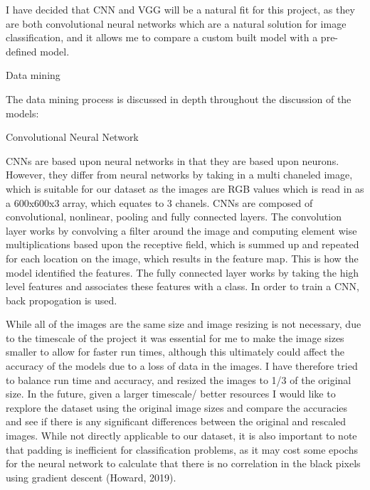 \documentclass[11pt]{article}
\begin{document}
I have decided that CNN and VGG will be a natural fit for this project,
as they are both convolutional neural networks which are a natural
solution for image classification, and it allows me to compare a custom
built model with a pre-defined model.

Data mining

The data mining process is discussed in depth throughout the discussion
of the models:

    Convolutional Neural Network

CNNs are based upon neural networks in that they are based upon neurons.
However, they differ from neural networks by taking in a multi chaneled
image, which is suitable for our dataset as the images are RGB values
which is read in as a 600x600x3 array, which equates to 3 chanels. CNNs
are composed of convolutional, nonlinear, pooling and fully connected
layers. The convolution layer works by convolving a filter around the
image and computing element wise multiplications based upon the
receptive field, which is summed up and repeated for each location on
the image, which results in the feature map. This is how the model
identified the features. The fully connected layer works by taking the
high level features and associates these features with a class. In order
to train a CNN, back propogation is used.

    While all of the images are the same size and image resizing is not
necessary, due to the timescale of the project it was essential for me
to make the image sizes smaller to allow for faster run times, although
this ultimately could affect the accuracy of the models due to a loss of
data in the images. I have therefore tried to balance run time and
accuracy, and resized the images to 1/3 of the original size. In the
future, given a larger timescale/ better resources I would like to
rexplore the dataset using the original image sizes and compare the
accuracies and see if there is any significant differences between the
original and rescaled images. While not directly applicable to our
dataset, it is also important to note that padding is inefficient for
classification problems, as it may cost some epochs for the neural
network to calculate that there is no correlation in the black pixels
using gradient descent (Howard, 2019).
\end{document}
